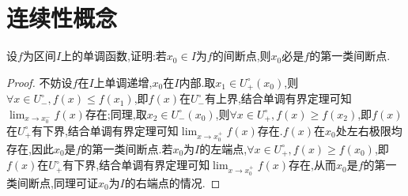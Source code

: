 \section{连续性概念}
\begin{problem}
    设$f$为区间$I$上的单调函数,证明:若$x_0\in I$为$f$的间断点,则$x_0$必是$f$的第一类间断点.
\end{problem}
\begin{proof}
    不妨设$f$在$I$上单调递增,$x_0$在$I$内部.取$x_1\in U^{\circ}_{+}(x_0)$,则$\forall x\in U^{\circ}_{-},f(x)\leq f(x_1)$,即$f(x)$在$U^{\circ}_{-}$有上界,结合单调有界定理可知$\displaystyle\lim_{x\to x_0^-}f(x)$存在;同理,取$x_2\in U^{\circ}_{-}(x_0)$,则$\forall x\in U^{\circ}_{+},f(x)\geq f(x_2)$,即$f(x)$在$U^{\circ}_{+}$有下界,结合单调有界定理可知$\displaystyle\lim_{x\to x_0^+}f(x)$存在.$f(x)$在$x_0$处左右极限均存在,因此$x_0$是$f$的第一类间断点.若$x_0$为$I$的左端点,$\forall x\in U^{\circ}_{+},f(x)\geq f(x_0)$,即$f(x)$在$U^{\circ}_{+}$有下界,结合单调有界定理可知$\displaystyle\lim_{x\to x_0^+}f(x)$存在,从而$x_0$是$f$的第一类间断点,同理可证$x_0$为$I$的右端点的情况.
\end{proof}